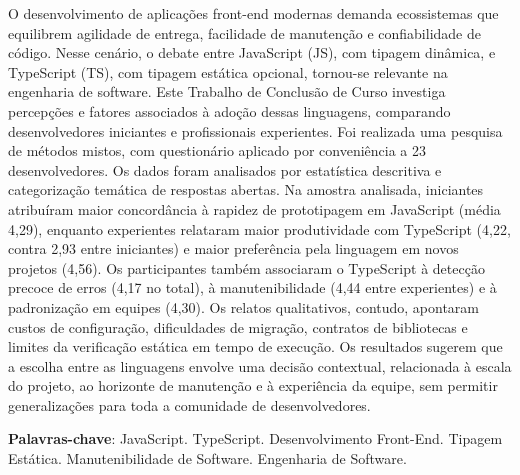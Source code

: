 %
%

\begin{center}
\imprimirtitulo
\end{center}

\begin{resumo}
O desenvolvimento de aplicações front-end modernas demanda ecossistemas que equilibrem agilidade de entrega, facilidade de manutenção e confiabilidade de código. Nesse cenário, o debate entre JavaScript (JS), com tipagem dinâmica, e TypeScript (TS), com tipagem estática opcional, tornou-se relevante na engenharia de software. Este Trabalho de Conclusão de Curso investiga percepções e fatores associados à adoção dessas linguagens, comparando desenvolvedores iniciantes e profissionais experientes. Foi realizada uma pesquisa de métodos mistos, com questionário aplicado por conveniência a 23 desenvolvedores. Os dados foram analisados por estatística descritiva e categorização temática de respostas abertas. Na amostra analisada, iniciantes atribuíram maior concordância à rapidez de prototipagem em JavaScript (média 4,29), enquanto experientes relataram maior produtividade com TypeScript (4,22, contra 2,93 entre iniciantes) e maior preferência pela linguagem em novos projetos (4,56). Os participantes também associaram o TypeScript à detecção precoce de erros (4,17 no total), à manutenibilidade (4,44 entre experientes) e à padronização em equipes (4,30). Os relatos qualitativos, contudo, apontaram custos de configuração, dificuldades de migração, contratos de bibliotecas e limites da verificação estática em tempo de execução. Os resultados sugerem que a escolha entre as linguagens envolve uma decisão contextual, relacionada à escala do projeto, ao horizonte de manutenção e à experiência da equipe, sem permitir generalizações para toda a comunidade de desenvolvedores.

\vspace{\onelineskip}
\noindent
\textbf{Palavras-chave}: JavaScript. TypeScript. Desenvolvimento Front-End. Tipagem Estática. Manutenibilidade de Software. Engenharia de Software.
\end{resumo}
